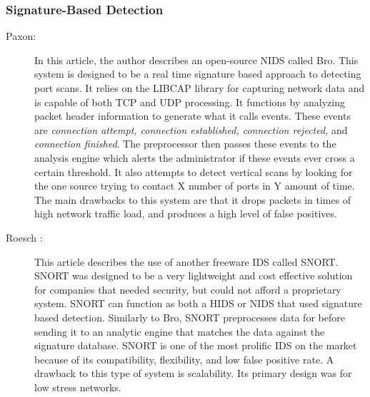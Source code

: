 \documentclass{acm_proc_article-sp}
\begin{document}
		\subsubsection{Signature-Based Detection}
		\begin{description}
			\item[Paxon:] %
				In this article, the author describes an open-source NIDS called Bro. This system is designed to be a real time signature based approach to detecting port scans. It relies on the LIBCAP library for capturing network data and is capable of both TCP and UDP processing. It functions by analyzing packet header information to generate what it calls events. These events are \emph{connection attempt, connection established, connection rejected,} and \emph{connection finished}. The preprocessor then passes these events to the analysis engine which alerts the administrator if these events ever cross a certain threshold. It also attempts to detect vertical scans by looking for the one source trying to contact X number of ports in Y amount of time. The main drawbacks to this system are that it drops packets in times of high network traffic load, and produces a high level of false positives. 
			\item[Roesch \cite{Roesch1999}:]
				This article describes the use of another freeware IDS called SNORT. SNORT was designed to be a very lightweight and cost effective solution for companies that needed security, but could not afford a proprietary system. SNORT can function as both a HIDS or NIDS that used signature based detection. Similarly to Bro, SNORT preprocesses data for before sending it to an analytic engine that matches the data against the signature database. SNORT is one of the most prolific IDS on the market because of its compatibility, flexibility, and low false positive rate. A drawback to this type of system is scalability. Its primary design was for low stress networks.
						
		\end{description}
\end{document}
